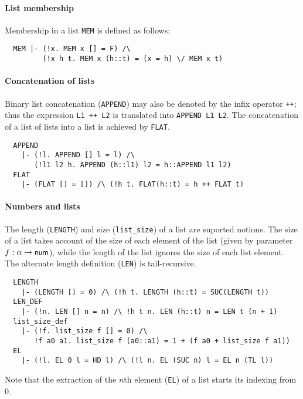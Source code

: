 \paragraph{List membership}

Membership in a list {\small\verb+MEM+} is defined as follows:
%
{\small
\begin{verbatim}
  MEM |- (!x. MEM x [] = F) /\
         (!x h t. MEM x (h::t) = (x = h) \/ MEM x t)
\end{verbatim}}

\paragraph {Concatenation of lists}

Binary list concatenation ({\small\verb+APPEND+}) may also be denoted by
the infix operator {\small\verb|++|}; thus the expression
{\small\verb|L1 ++ L2|} is translated into {\small\verb+APPEND L1 L2+}.
The concatenation of a list of lists into a list is achieved by
{\small\verb+FLAT+}.
%
{\small
\begin{verbatim}
  APPEND
    |- (!l. APPEND [] l = l) /\
       (!l1 l2 h. APPEND (h::l1) l2 = h::APPEND l1 l2)
  FLAT
    |- (FLAT [] = []) /\ (!h t. FLAT(h::t) = h ++ FLAT t)
\end{verbatim}}

\paragraph {Numbers and lists}

The length ({\small\verb+LENGTH+}) and size ({\small\verb+list_size+})
of a list are suported notions. The size of a list takes account of
the size of each element of the list (given by parameter
$f:\alpha\to\mbox{\small{\textbf{\sf{num}}}}$), while the length of the list ignores the
size of each list element. The alternate length definition
({\small\verb+LEN+}) is tail-recursive.
%
{\small
\begin{verbatim}
  LENGTH
    |- (LENGTH [] = 0) /\ (!h t. LENGTH (h::t) = SUC(LENGTH t))
  LEN_DEF
    |- (!n. LEN [] n = n) /\ !h t n. LEN (h::t) n = LEN t (n + 1)
  list_size_def
    |- (!f. list_size f [] = 0) /\
       !f a0 a1. list_size f (a0::a1) = 1 + (f a0 + list_size f a1))
  EL
    |- (!l. EL 0 l = HD l) /\ (!l n. EL (SUC n) l = EL n (TL l))
\end{verbatim}}

\noindent
Note that the extraction of the $n$th element ({\small\verb+EL+}) of a
list starts its indexing from 0.

